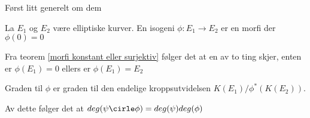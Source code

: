 Først litt generelt om dem
\begin{definisjon}
La $E_1$ og $E_2$ være elliptiske kurver. En isogeni $\phi : E_1 \rightarrow E_2$ er en morfi der $\phi(0) = 0$
\end{definisjon}
Fra teorem \ref{morfi konstant eller surjektiv} følger det at en av to ting skjer, enten er $\phi(E_1) = 0$ ellers er $\phi(E_1) = E_2$

Graden til $\phi$ er graden til den endelige kroppsutvidelsen $K(E_1)/\phi^*(K(E_2))$.

Av dette følger det at $deg(\psi \cirle \phi) = deg(\psi)deg(\phi)$